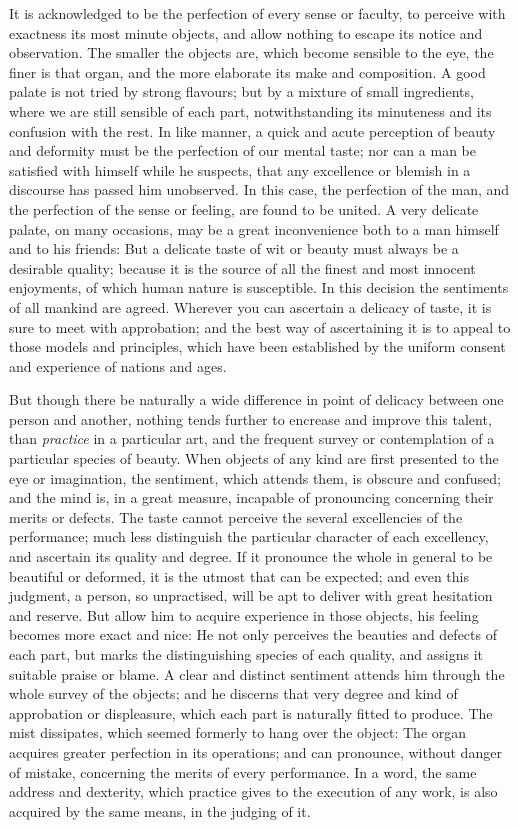 It is acknowledged to be the perfection of every sense or faculty, to
perceive with exactness its most minute objects, and allow nothing to
escape its notice and observation. The smaller the objects are, which
become sensible to the eye, the finer is that organ, and the more
elaborate its make and composition. A good palate is not tried by
strong flavours; but by a mixture of small ingredients, where we are
still sensible of each part, notwithstanding its minuteness and its
confusion with the rest. In like manner, a quick and acute perception
of beauty and deformity must be the perfection of our mental taste;
nor can a man be satisfied with himself while he suspects, that any
excellence or blemish in a discourse has passed him unobserved. In
this case, the perfection of the man, and the perfection of the sense
or feeling, are found to be united. A very delicate palate, on many
occasions, may be a great inconvenience both to a man himself and to
his friends: But a delicate taste of wit or beauty must always be a
desirable quality; because it is the source of all the finest and most
innocent enjoyments, of which human nature is susceptible. In this
decision the sentiments of all mankind are agreed. Wherever you can
ascertain a delicacy of taste, it is sure to meet with approbation;
and the best way of ascertaining it is to appeal to those models and
principles, which have been established by the uniform consent and
experience of nations and ages.

But though there be naturally a wide difference in point of delicacy
between one person and another, nothing tends further to encrease and
improve this talent, than \textit{practice} in a particular art, and
the frequent survey or contemplation of a particular species of
beauty. When objects of any kind are first presented to the eye or
imagination, the sentiment, which attends them, is obscure and
confused; and the mind is, in a great measure, incapable of
pronouncing concerning their merits or defects. The taste cannot
perceive the several excellencies of the performance; much less
distinguish the particular character of each excellency, and ascertain
its quality and degree. If it pronounce the whole in 
general to be beautiful or deformed, it is the utmost that can be
expected; and even this judgment, a person, so unpractised, will be
apt to deliver with great hesitation and reserve. But allow him to
acquire experience in those objects, his feeling becomes more exact
and nice: He not only perceives the beauties and defects of each part,
but marks the distinguishing species of each quality, and assigns it
suitable praise or blame. A clear and distinct sentiment attends him
through the whole survey of the objects; and he discerns that very
degree and kind of approbation or displeasure, which each part is
naturally fitted to produce. The mist dissipates, which seemed
formerly to hang over the object: The organ acquires greater
perfection in its operations; and can pronounce, without danger of
mistake, concerning the merits of every performance. In a word, the
same address and dexterity, which practice gives to the execution of
any work, is also acquired by the same means, in the judging of it.

